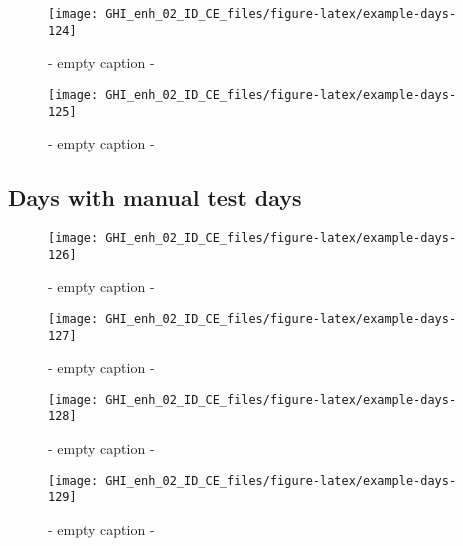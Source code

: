 \documentclass[
  10pt,
  a4paper,oneside]{article}
\begin{document}
\begin{figure}[H]

{\centering \texttt{[image: GHI\_enh\_02\_ID\_CE\_files/figure-latex/example-days-124]} 

}

\caption{ - empty caption - }\label{fig:example-days-124}
\end{figure}

\begin{figure}[H]

{\centering \texttt{[image: GHI\_enh\_02\_ID\_CE\_files/figure-latex/example-days-125]} 

}

\caption{ - empty caption - }\label{fig:example-days-125}
\end{figure}

\FloatBarrier

\hypertarget{days-with-manual-test-days}{%
\subsection{Days with manual test days}\label{days-with-manual-test-days}}

\begin{figure}[H]

{\centering \texttt{[image: GHI\_enh\_02\_ID\_CE\_files/figure-latex/example-days-126]} 

}

\caption{ - empty caption - }\label{fig:example-days-126}
\end{figure}

\begin{figure}[H]

{\centering \texttt{[image: GHI\_enh\_02\_ID\_CE\_files/figure-latex/example-days-127]} 

}

\caption{ - empty caption - }\label{fig:example-days-127}
\end{figure}

\begin{figure}[H]

{\centering \texttt{[image: GHI\_enh\_02\_ID\_CE\_files/figure-latex/example-days-128]} 

}

\caption{ - empty caption - }\label{fig:example-days-128}
\end{figure}

\begin{figure}[H]

{\centering \texttt{[image: GHI\_enh\_02\_ID\_CE\_files/figure-latex/example-days-129]} 

}

\caption{ - empty caption - }\label{fig:example-days-129}
\end{figure}
\end{document}
